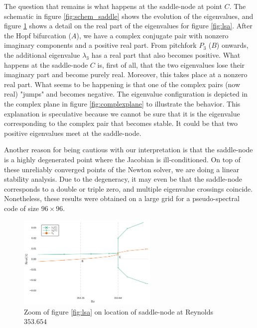 The question that remains is what happens at the saddle-node at point $C$. The
schematic in figure \ref{fig:schem_saddle} shows the evolution of the
eigenvalues, and figure \ref{fig:lsa_zoom} shows a detail on the real part of
the eigenvalues for figure \ref{fig:lsa}. After the Hopf bifurcation ($A$), we
have a complex conjugate pair with nonzero imaginary components and a positive
real part. From pitchfork $P_3$ ($B$) onwards, the additional eigenvalue
$\lambda_3$ has a real part that also becomes positive. What happens at the
saddle-node $C$ is, first of all, that the two eigenvalues lose their imaginary
part and become purely real. Moreover, this takes place at a nonzero real part.
What seems to be happening is that one of the complex pairs (now real) "jumps"
and becomes negative. The eigenvalue configuration is depicted in the complex
plane in figure \ref{fig:complexplane} to illustrate the behavior. This
explanation is speculative because we cannot be sure that it is the eigenvalue
corresponding to the complex pair that becomes stable. It could be that two
positive eigenvalues meet at the saddle-node.

Another reason for being cautious with our interpretation is that the
saddle-node is a highly degenerated point where the Jacobian is
ill-conditioned. On top of these unreliably converged points of the Newton
solver, we are doing a linear stability analysis. Due to the degeneracy, it may
even be that the saddle-node corresponds to a double or triple zero, and
multiple eigenvalue crossings coincide. Nonetheless, these results were
obtained on a large grid for a pseudo-spectral code of size $96 \times 96$.

\vspace{100pt}

\begin{figure}[h!]
  \centering
  \includegraphics[width=0.6\textwidth]{figs/lsa_sn_zoom96x96.pdf}
  \caption{Zoom of figure \ref{fig:lsa} on location of saddle-node at Reynolds $353.654$} 
  \label{fig:lsa_zoom}
\end{figure}

